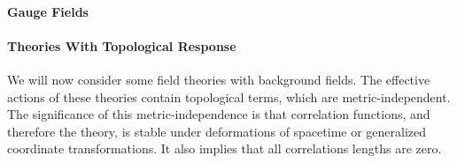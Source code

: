 \paragraph{Gauge Fields}

\paragraph{Theories With Topological Response}
We will now consider some field theories with background fields. The effective actions of these theories contain topological terms, which are metric-independent. The significance of this metric-independence is that correlation functions, and therefore the theory, is stable under deformations of spacetime or generalized coordinate transformations. It also implies that all correlations lengths are zero.

